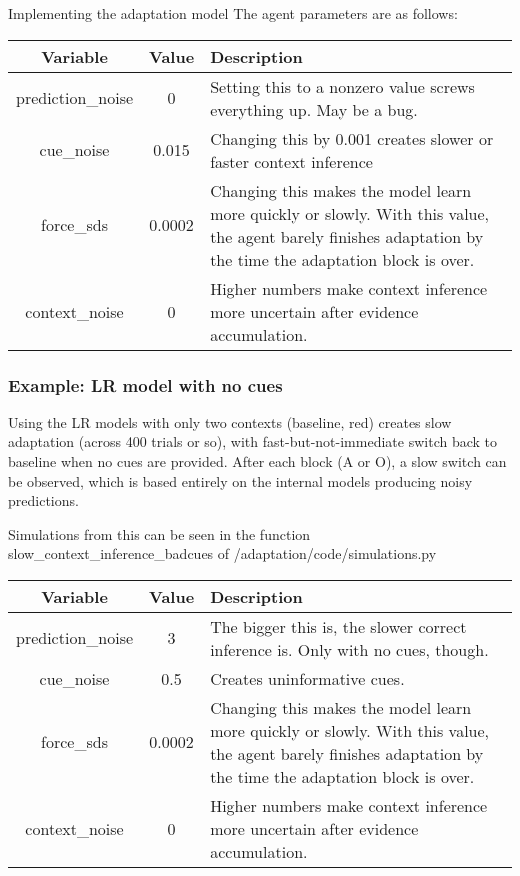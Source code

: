 \documentclass{report}
\begin{document}
\begin{chapter}{Implementing the adaptation model}
The agent parameters are as follows:

\begin{center}
\begin{tabularx}{0.8\textwidth}{ c | c | X}
  Variable & Value & Description \\ \hline
  prediction\_noise & 0 & Setting this to a nonzero value screws everything up. May be a bug. \\  
  cue\_noise & 0.015 & Changing this by 0.001 creates slower or faster context inference \\
  force\_sds & 0.0002 & Changing this makes the model learn more quickly or slowly. With this value, the agent barely finishes adaptation by the time the adaptation block is over. \\
  context\_noise & 0 & Higher numbers make context inference more uncertain after evidence accumulation.
\end{tabularx}
\end{center}

\subsubsection{Example: LR model with no cues}
Using the LR models with only two contexts (baseline, red) creates slow
adaptation (across 400 trials or so), with fast-but-not-immediate switch back
to baseline when no cues are provided. After each block (A or O), a slow switch
can be observed, which is based entirely on the internal models producing noisy
predictions.

Simulations from this can be seen in the function
slow\_context\_inference\_badcues of /adaptation/code/simulations.py

\begin{center}
\begin{tabularx}{0.8\textwidth}{ c | c | X}
  Variable & Value & Description \\ \hline
  prediction\_noise & 3 & The bigger this is, the slower correct inference is. Only with no cues, though. \\  
  cue\_noise & 0.5 & Creates uninformative cues. \\
  force\_sds & 0.0002 & Changing this makes the model learn more quickly or slowly. With this value, the agent barely finishes adaptation by the time the adaptation block is over. \\
  context\_noise & 0 & Higher numbers make context inference more uncertain after evidence accumulation.  
\end{tabularx}
\end{center}




\end{chapter}
\end{document}
